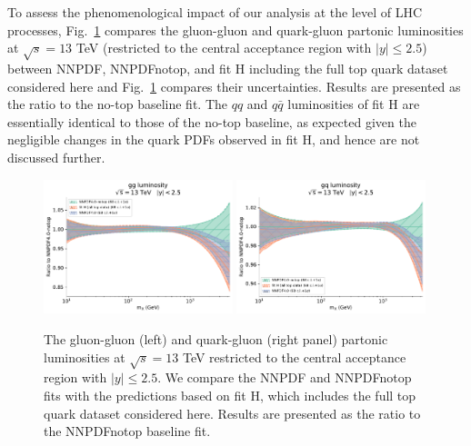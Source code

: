 \documentclass[withindex,glossary]{cam-thesis}
\begin{document}
 To assess the phenomenological impact of our analysis at the level
 of LHC processes, Fig.~\ref{fig:fith_luminosities}
 compares the gluon-gluon and quark-gluon 
  partonic luminosities at $\sqrt{s}=13$ TeV (restricted to
  the central acceptance region with $|y|\le 2.5$)
between  NNPDF, NNPDFnotop, and fit H including the full top quark dataset
  considered here and Fig.~\ref{fig:fith_luminosities} compares their
  uncertainties. 
  Results are presented as the ratio to the no-top baseline fit.
  The $qq$ and $q\bar{q}$ luminosities of fit H are essentially
  identical to those of the no-top baseline, as expected given the negligible changes in the quark PDFs observed   in fit H, and hence are not discussed further. 

\begin{figure}[t]
\centering
\includegraphics[width=0.49\textwidth]{pdf_plots/fitH_gg_lumi.pdf}
\includegraphics[width=0.49\textwidth]{pdf_plots/fitH_gq_lumi.pdf}
\caption{The gluon-gluon (left) and quark-gluon (right panel)
  partonic luminosities at $\sqrt{s}=13$ TeV restricted to
  the central acceptance region with $|y|\le 2.5$.
  We compare the NNPDF and NNPDFnotop fits with the
  predictions based on fit H, which includes the full top quark dataset
  considered here.
  Results are presented as the ratio to the NNPDFnotop baseline fit.
}
\label{fig:fith_luminosities}
\end{figure}
\end{document}
